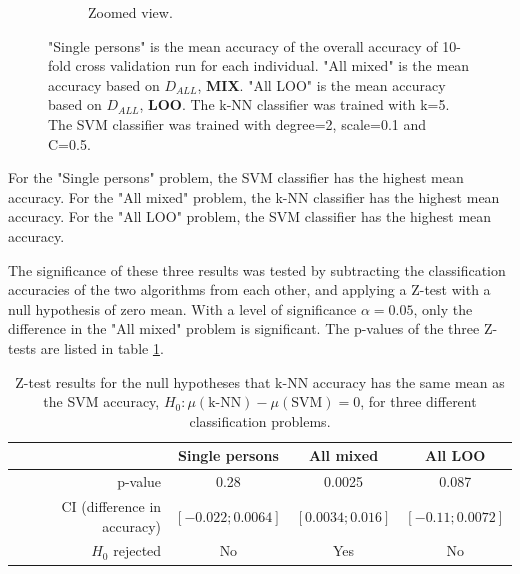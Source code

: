 \begin{figure}[h]
\begin{subfigure}{\figscale}
\caption[k-NN and SVM classification accuracies, zoomed view.]
{
Zoomed view.
}
\label{fig:knn-vs-svm-zoomed}
\end{subfigure}
\caption[k-NN and SVM classification accuracies]{
"Single persons" is the mean accuracy of the overall accuracy of 10-fold cross validation run for each individual.
"All mixed" is the mean accuracy based on $D_{ALL}$, \textbf{MIX}.
"All LOO" is the mean accuracy based on $D_{ALL}$, \textbf{LOO}.
The k-NN classifier was trained with k=5. The SVM classifier was trained with degree=2, scale=0.1 and C=0.5.
}
\end{figure}

For the "Single persons" problem, the SVM classifier has the highest mean accuracy.
For the "All mixed" problem, the k-NN classifier has the highest mean accuracy.
For the "All LOO" problem, the SVM classifier has the highest mean accuracy.

The significance of these three results was tested by subtracting the classification
accuracies of the two algorithms from each other,
and applying a Z-test with a null hypothesis of zero mean.
With a level of significance \(\alpha=0.05\),
only the difference in the "All mixed" problem is significant.
The p-values of the three Z-tests are listed in table \ref{tb:ztest}.

\begin{table}
\centering
\caption[Z-test results]
{
Z-test results for the null hypotheses that k-NN accuracy has
the same mean as the SVM accuracy, \(H_0:\mu\left(\text{k-NN}\right)-\mu\left(\text{SVM}\right)=0\), for three different classification problems.
}
\begin{tabular}{|r||c|c|c|}
\hline
 & Single persons & All mixed & All LOO
 \\
 \hline
p-value & 0.28 & 0.0025 & 0.087
\\
CI (difference in accuracy)& \(\left[-0.022;0.0064\right]\)
& \(\left[0.0034;0.016\right]\)
& \(\left[-0.11;0.0072\right]\)
\\
\(H_0\) rejected & No & Yes & No
\\
\hline
\end{tabular}

\label{tb:ztest}
\end{table}
